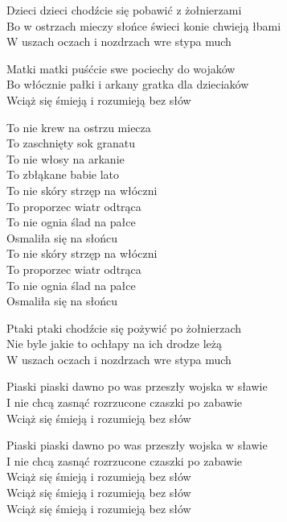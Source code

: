 \begin{text}
    Dzieci dzieci chodźcie się pobawić z żołnierzami\\
    Bo w ostrzach mieczy słońce świeci konie chwieją łbami\\
    W uszach oczach i nozdrzach wre stypa much

    Matki matki puśćcie swe pociechy do wojaków\\
    Bo włócznie pałki i arkany gratka dla dzieciaków\\
    Wciąż się śmieją i rozumieją bez słów

    To nie krew na ostrzu miecza\\
    To zaschnięty sok granatu\\
    To nie włosy na arkanie\\
    To zbłąkane babie lato\\
    To nie skóry strzęp na włóczni\\
    To proporzec wiatr odtrąca\\
    To nie ognia ślad na pałce\\
    Osmaliła się na słońcu\\
    To nie skóry strzęp na włóczni\\
    To proporzec wiatr odtrąca\\
    To nie ognia ślad na pałce\\
    Osmaliła się na słońcu

    Ptaki ptaki chodźcie się pożywić po żołnierzach\\
    Nie byle jakie to ochłapy na ich drodze leżą\\
    W uszach oczach i nozdrzach wre stypa much

    Piaski piaski dawno po was przeszły wojska w sławie\\
    I nie chcą zasnąć rozrzucone czaszki po zabawie\\
    Wciąż się śmieją i rozumieją bez słów

    Piaski piaski dawno po was przeszły wojska w sławie\\
    I nie chcą zasnąć rozrzucone czaszki po zabawie\\
    Wciąż się śmieją i rozumieją bez słów\\
    Wciąż się śmieją i rozumieją bez słów\\
    Wciąż się śmieją i rozumieją bez słów
\end{text}
